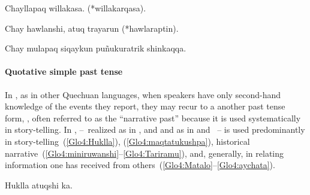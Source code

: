 %
{Chayllapaq willakasa. (*willakarqasa).}%
{}%
{}{}%

%
{Chay hawlanshi, atuq trayarun (*hawlaraptin).}%
{}%
{}{}%

%
{Chay mulapaq siqaykun puñukuratrik shinkaqqa.}%
{}%
{}{}%

\paragraph{Quotative simple past tense }\label{par:QSPT}
In \SYQ, as in other Quechuan languages, when speakers have only second-hand knowledge of the events they report, they may recur to a another past tense form, , often referred to as the “narrative past” because it is used systematically in story-telling. In \SYQ,  --~realized as  in \ACH, \AMV{} and \SP{} and as  in \CH{} and \LT~-- is used predominantly in story-telling~(\ref{Glo4:Huklla}), (\ref{Glo4:maqtatukushpa}), historical narrative~(\ref{Glo4:miniruwanshi}--\ref{Glo4:Tariramu}), and, generally, in relating information one has received from others~(\ref{Glo4:Matalo}--\ref{Glo4:aychata}).

%
{Huklla atuqshi ka.}%
{}%
{}{}%

